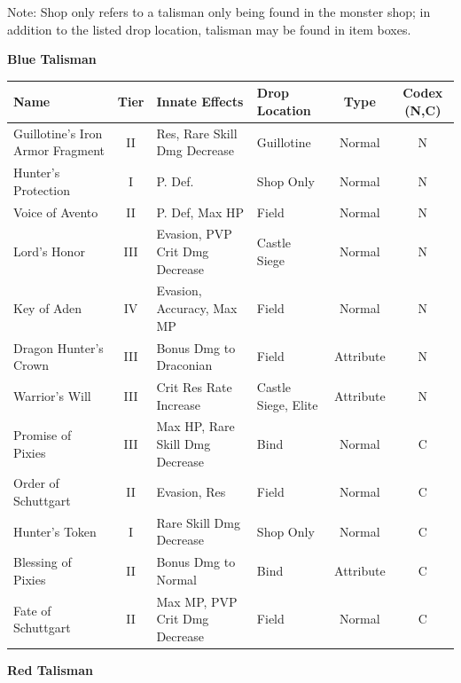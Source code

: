 \documentclass[]{article}
\begin{document}
\pagebreak
Note: Shop only refers to a talisman only being found in the monster shop;
in addition to the listed drop location, talisman may be found in item boxes.
\begin{center}
	\textbf{Blue Talisman}
	\begin{tabular}{|>{\centering}m{4cm}|c|>{\centering}m{4cm}|>{\centering}m{3cm}|c|c|}
		\hline 
		Name & Tier & Innate Effects & Drop Location & Type & Codex (N,C)\\ 
		\hline 
		Guillotine's Iron Armor Fragment & II & Res, Rare Skill Dmg Decrease & Guillotine & Normal & N \\ 
		Hunter's Protection & I & P. Def. & Shop Only & Normal & N \\ 
		Voice of Avento & II & P. Def, Max HP & Field & Normal & N \\ 
		Lord's Honor & III & Evasion, PVP Crit Dmg Decrease & Castle Siege & Normal & N \\ 
		Key of Aden & IV & Evasion, Accuracy, Max MP & Field & Normal & N\\ 
		Dragon Hunter's Crown & III & Bonus Dmg to Draconian & Field & Attribute & N\\ 
		Warrior's Will & III & Crit Res Rate Increase & Castle Siege, Elite & Attribute & N\\ 
		Promise of Pixies & III & Max HP, Rare Skill Dmg Decrease & Bind & Normal & C\\
		
		Order of Schuttgart & II & Evasion, Res & Field & Normal & C\\
		
		Hunter's Token & I & Rare Skill Dmg Decrease & Shop Only & Normal & C\\
		
		Blessing of Pixies & II & Bonus Dmg to Normal & Bind & Attribute & C\\
		
		Fate of Schuttgart & II & Max MP, PVP Crit Dmg Decrease & Field & Normal & C\\
		
		\hline
	\end{tabular} 


\textbf{Red Talisman}


\end{center}
\end{document}
